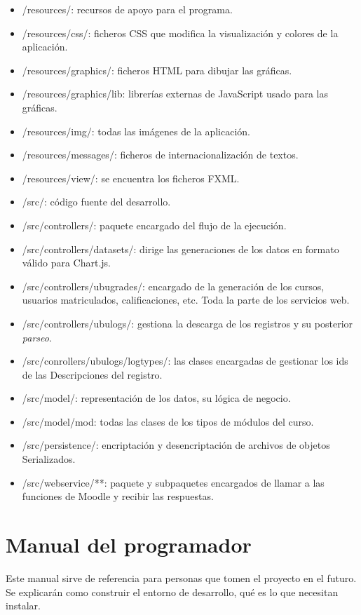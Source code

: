 \begin{itemize}
	\item /resources/: recursos de apoyo para el programa.
	\item /resources/css/: ficheros CSS que modifica la visualización y colores de la aplicación.
	\item /resources/graphics/: ficheros HTML para dibujar las gráficas.
	\item /resources/graphics/lib: librerías externas de JavaScript usado para las gráficas.
	\item /resources/img/: todas las imágenes de la aplicación.
	\item /resources/messages/: ficheros de internacionalización de textos.
	\item /resources/view/: se encuentra los ficheros FXML.
	\item /src/: código fuente del desarrollo.
	\item /src/controllers/: paquete encargado del flujo de la ejecución.
	\item /src/controllers/datasets/: dirige las generaciones de los datos en formato válido para Chart.js.
	\item /src/controllers/ubugrades/: encargado de la generación de los cursos, usuarios matriculados, calificaciones, etc. Toda la parte de los servicios web.
	\item /src/controllers/ubulogs/: gestiona la descarga de los registros y su posterior \textit{parseo}.
	\item /src/conrollers/ubulogs/logtypes/: las clases encargadas de gestionar los ids de las Descripciones del registro.
	\item /src/model/: representación de los datos, su lógica de negocio.
	\item /src/model/mod: todas las clases de los tipos de módulos del curso.
	\item /src/persistence/: encriptación y desencriptación de archivos de objetos Serializados.
	\item /src/webservice/**: paquete y subpaquetes encargados de llamar a las funciones de Moodle y recibir las respuestas.
\end{itemize}

\section{Manual del programador} \label{sec:manual_programdor}

Este manual sirve de referencia para personas que tomen el proyecto en el futuro. Se explicarán como construir el entorno de desarrollo, qué es lo que necesitan instalar.

